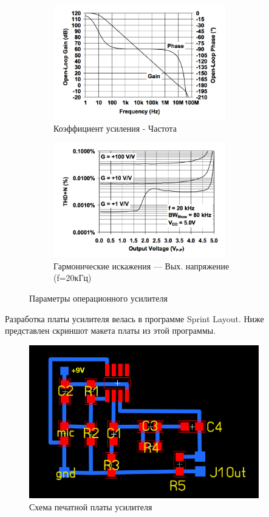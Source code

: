 \documentclass[../paper.tex]{subfiles}
\begin{document}
\begin{figure}[H]
\begin{subfigure}{0.5\textwidth}
\includegraphics[width=0.9\linewidth, height=5cm]{images/op-amp-plot5.png} 
\caption{Коэффициент усиления - Частота}
\end{subfigure}
\begin{subfigure}{0.5\textwidth}
\includegraphics[width=0.9\linewidth, height=5cm]{images/op-amp-plot6.png}
\caption{\small{Гармонические искажения --- Вых. напряжение (f=20кГц)}}
\end{subfigure}

\caption{Параметры операционного усилителя}
\end{figure}

Разработка платы усилителя велась в программе Sprint Layout. Ниже представлен скриншот макета платы из этой программы.

\begin{figure}[H]
\centering
\includegraphics[width=10cm]{images/sprint-layout-circuit.png}
\caption{Схема печатной платы усилителя}
\end{figure}
\end{document}
